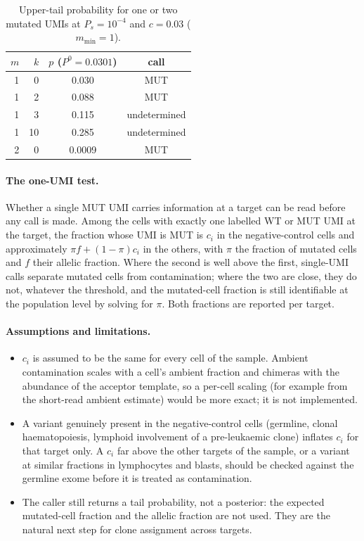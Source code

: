 \documentclass[11pt]{article}
\begin{document}
\begin{table}[h]
\centering
\begin{tabular}{rrcc}
\toprule
$m$ & $k$ & $p$ ($P^{0}=0.0301$) & call \\
\midrule
1 & 0  & 0.030 & MUT \\
1 & 2  & 0.088 & MUT \\
1 & 3  & 0.115 & undetermined \\
1 & 10 & 0.285 & undetermined \\
2 & 0  & 0.0009 & MUT \\
\bottomrule
\end{tabular}
\caption{Upper-tail probability for one or two mutated UMIs at $P_{s}=10^{-4}$ and $c = 0.03$ ($m_{\min}=1$).}
\label{tab:p-c}
\end{table}

\paragraph{The one-UMI test.} Whether a single MUT UMI carries information at a target can be read before any call is made. Among the cells with exactly one labelled WT or MUT UMI at the target, the fraction whose UMI is MUT is $c_i$ in the negative-control cells and approximately $\pi f + (1-\pi) c_i$ in the others, with $\pi$ the fraction of mutated cells and $f$ their allelic fraction. Where the second is well above the first, single-UMI calls separate mutated cells from contamination; where the two are close, they do not, whatever the threshold, and the mutated-cell fraction is still identifiable at the population level by solving for $\pi$. Both fractions are reported per target.

\paragraph{Assumptions and limitations.}
\begin{itemize}
\item $c_i$ is assumed to be the same for every cell of the sample. Ambient contamination scales with a cell's ambient fraction and chimeras with the abundance of the acceptor template, so a per-cell scaling (for example from the short-read ambient estimate) would be more exact; it is not implemented.
\item A variant genuinely present in the negative-control cells (germline, clonal haematopoiesis, lymphoid involvement of a pre-leukaemic clone) inflates $c_i$ for that target only. A $c_i$ far above the other targets of the sample, or a variant at similar fractions in lymphocytes and blasts, should be checked against the germline exome before it is treated as contamination.
\item The caller still returns a tail probability, not a posterior: the expected mutated-cell fraction and the allelic fraction are not used. They are the natural next step for clone assignment across targets.
\end{itemize}
\end{document}
